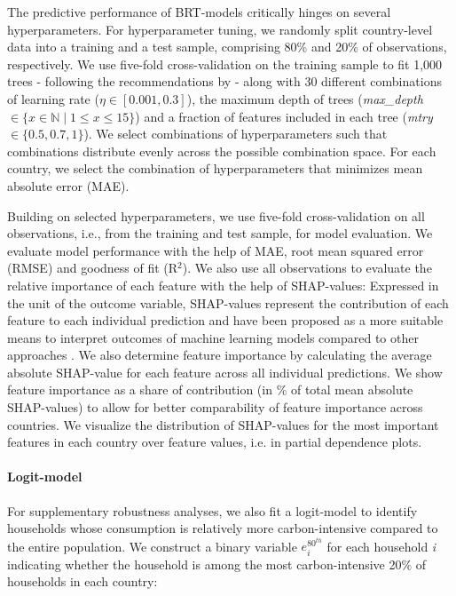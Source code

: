 \documentclass[12pt, a4paper]{article}
\begin{document}
The predictive performance of BRT-models critically hinges on several hyperparameters. For hyperparameter tuning, we randomly split country-level data into a training and a test sample, comprising 80\% and 20\% of observations, respectively. We use five-fold cross-validation on the training sample to fit 1,000 trees - following the recommendations by \textcite{Elith.2008} - along with 30 different combinations of learning rate ($\eta \in [0.001,0.3]$), the maximum depth of trees (\textit{max\_depth} $\in \{x \in \mathbb{N} \mid 1  \leq x \leq 15 \}$) and a fraction of features included in each tree (\textit{mtry} $\in \{0.5,0.7,1\}$). We select combinations of hyperparameters such that combinations distribute evenly across the possible combination space. For each country, we select the combination of hyperparameters that minimizes mean absolute error (MAE).

Building on selected hyperparameters, we use five-fold cross-validation on all observations, i.e., from the training and test sample, for model evaluation. We evaluate model performance with the help of MAE, root mean squared error (RMSE) and goodness of fit (R$^{2}$). We also use all observations to evaluate the relative importance of each feature with the help of SHAP-values: Expressed in the unit of the outcome variable, SHAP-values represent the contribution of each feature to each individual prediction and have been proposed as a more suitable means to interpret outcomes of machine learning models compared to other approaches \autocite{Lundberg.2020}. We also determine feature importance by calculating the average absolute SHAP-value for each feature across all individual predictions. We show feature importance as a share of contribution (in \% of total mean absolute SHAP-values) to allow for better comparability of feature importance across countries. We visualize the distribution of SHAP-values for the most important features in each country over feature values, i.e. in partial dependence plots. 

\paragraph{Logit-model} For supplementary robustness analyses, we also fit a logit-model to identify households whose consumption is relatively more carbon-intensive compared to the entire population. We construct a binary variable $e_{i}^{80^{th}}$ for each household \textit{i} indicating whether the household is among the most carbon-intensive 20\% of households in each country:
\end{document}
